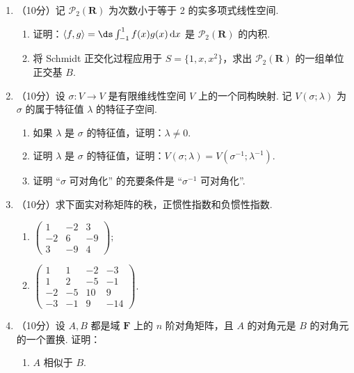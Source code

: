 \begin{enumerate}
    \item （10分）记 $\mathcal{P}_2(\mathbf{R})$ 为次数小于等于 2 的实多项式线性空间.
    \begin{enumerate}
        \item 证明：$\langle f,g\rangle =\ds\int_{-1}^1f(x)g(x)\,\mathrm{d}x$ 是 $\mathcal{P}_2(\mathbf{R})$ 的内积.

        \item 将 Schmidt 正交化过程应用于 $S=\{1,x,x^2\}$，求出 $\mathcal{P}_2(\mathbf{R})$ 的一组单位正交基 $B$.
    \end{enumerate}

    \item （10分）设 $\sigma\colon V\to V$ 是有限维线性空间 $V$ 上的一个同构映射. 记 $V(\sigma;\lambda)$ 为 $\sigma$ 的属于特征值 $\lambda$ 的特征子空间.
    \begin{enumerate}
        \item 如果 $\lambda$ 是 $\sigma$ 的特征值，证明：$\lambda \neq 0$.

        \item 证明 $\lambda$ 是 $\sigma$ 的特征值，证明：$V(\sigma;\lambda)=V(\sigma^{-1};\lambda^{-1})$.

        \item 证明 ``$\sigma$ 可对角化'' 的充要条件是 ``$\sigma^{-1}$ 可对角化''.
    \end{enumerate}

    \item （10分）求下面实对称矩阵的秩，正惯性指数和负惯性指数.
    \begin{enumerate}
        \item $\begin{pmatrix}1 & -2 & 3 \\ -2 & 6 & -9 \\ 3 & -9 & 4\end{pmatrix};$

        \item $\begin{pmatrix}1 & 1 & -2 & -3\\ 1 & 2 & -5 & -1 \\ -2 & -5 & 10 & 9 \\ -3 & -1 & 9 & -14\end{pmatrix}$.
    \end{enumerate}

    \item （10分）设 $A,B$ 都是域 $\mathbf{F}$ 上的 $n$ 阶对角矩阵，且 $A$ 的对角元是 $B$ 的对角元的一个置换. 证明：
    \begin{enumerate}
        \item $A$ 相似于 $B$.


\end{enumerate}
\end{enumerate}
